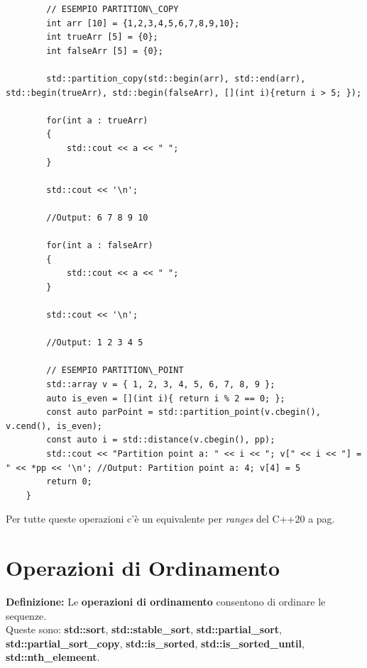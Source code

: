\begin{lstlisting}
		// ESEMPIO PARTITION\_COPY
		int arr [10] = {1,2,3,4,5,6,7,8,9,10};
		int trueArr [5] = {0};
		int falseArr [5] = {0};
		
		std::partition_copy(std::begin(arr), std::end(arr), std::begin(trueArr), std::begin(falseArr), [](int i){return i > 5; });
		
		for(int a : trueArr)
		{
			std::cout << a << " ";
		}
		
		std::cout << '\n';
		
		//Output: 6 7 8 9 10
		
		for(int a : falseArr)
		{
			std::cout << a << " ";
		}
		
		std::cout << '\n';
		
		//Output: 1 2 3 4 5
		
		// ESEMPIO PARTITION\_POINT
		std::array v = { 1, 2, 3, 4, 5, 6, 7, 8, 9 };
		auto is_even = [](int i){ return i % 2 == 0; };
		const auto parPoint = std::partition_point(v.cbegin(), v.cend(), is_even);
		const auto i = std::distance(v.cbegin(), pp);
		std::cout << "Partition point a: " << i << "; v[" << i << "] = " << *pp << '\n'; //Output: Partition point a: 4; v[4] = 5
		return 0;
	}
\end{lstlisting}

\fleuron

\textsf{\small Per tutte queste operazioni c'è un equivalente per \emph{ranges} del C++20 a pag. \pageref{ranges_partition}} \\


\newpage

\section{Operazioni di Ordinamento}

\textsf{\small \textbf{Definizione: } Le \textbf{operazioni di ordinamento} consentono di ordinare le sequenze.} \\

\textsf{\small Queste sono: \textbf{std::sort}, \textbf{std::stable\_sort}, \textbf{std::partial\_sort}, \textbf{std::partial\_sort\_copy}, \textbf{std::is\_sorted}, \textbf{std::is\_sorted\_until}, \textbf{std::nth\_elemeent}.} \\

